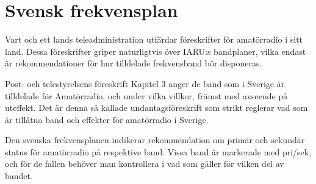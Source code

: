 \chapter{Svensk frekvensplan}
\label{svensk frekvensplan}

Vart och ett lands teleadministration utfärdar föreskrifter för amatörradio
i sitt land.
Dessa föreskrifter griper naturligtvis över IARU:s bandplaner, vilka endast
är rekommendationer för hur tilldelade frekvensband bör disponeras.

Post- och telestyrelsens föreskrift \cite[PTSFS~2015:4]{PTSFS2015:4} Kapitel 3
anger de band som i Sverige är tilldelade för Amatörradio, och under vilka
villkor, främst med avseende på uteffekt.
Det är denna så kallade undantagsföreskrift som strikt reglerar vad som är
tillåtna band och effekter för amatörradio i Sverige.

Den svenska frekvensplanen \cite[PTSFS~2015:3]{PTSFS2015:3} indikerar
rekommendation om primär och sekundär status för amatörradio på respektive
band.
Vissa band är markerade med pri/sek, och för de fallen behöver man
kontrollera i \cite[PTSFS~2015:3]{PTSFS2015:3} vad som gäller för vilken del av
bandet.

